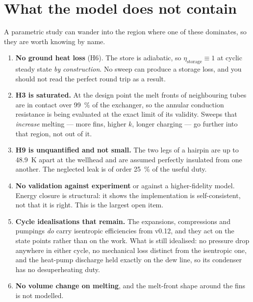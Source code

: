 \documentclass[11pt,a4paper]{article}
\begin{document}
\section{What the model does not contain}
\label{sec:limits}

A parametric study can wander into the region where one of these dominates, so
they are worth knowing by name.

\begin{enumerate}\itemsep3pt
\item \textbf{No ground heat loss} (H6). The store is adiabatic, so
  $\eta_{\mathrm{storage}}\equiv1$ at cyclic steady state \emph{by
  construction}. No sweep can produce a storage loss, and you should not read
  the perfect round trip as a result.

\item \textbf{H3 is saturated.} At the design point the melt fronts of
  neighbouring tubes are in contact over \SI{99}{\percent} of the exchanger, so
  the annular conduction resistance is being evaluated at the exact limit of its
  validity. Sweeps that \emph{increase} melting --- more fins, higher $k$, longer
  charging --- go further into that region, not out of it.

\item \textbf{H9 is unquantified and not small.} The two legs of a hairpin are
  up to \SI{48.9}{\kelvin} apart at the wellhead and are assumed perfectly
  insulated from one another. The neglected leak is of order \SI{25}{\percent}
  of the useful duty.

\item \textbf{No validation against experiment} or against a
  higher-fidelity model. Energy closure is structural: it shows the
  implementation is self-consistent, not that it is right. This is the largest
  open item.

\item \textbf{Cycle idealisations that remain.} The expansions, compressions
  and pumpings \emph{do} carry isentropic efficiencies from v0.12, and they act
  on the state points rather than on the work. What is still idealised: no
  pressure drop anywhere in either cycle, no mechanical loss distinct from the
  isentropic one, and the heat-pump discharge held exactly on the dew line, so
  its condenser has no desuperheating duty.

\item \textbf{No volume change on melting}, and the melt-front shape around the
  fins is not modelled.
\end{enumerate}
\end{document}
